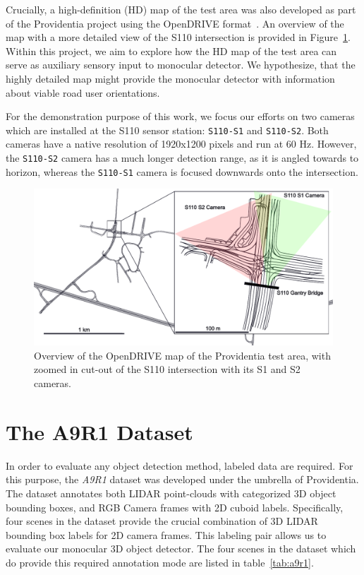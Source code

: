 Crucially, a high-definition (HD) map of the test area was also developed as part of the Providentia project using the OpenDRIVE format~\cite{dupuis2010opendrive}.
An overview of the map with a more detailed view of the S110 intersection is provided in Figure~\ref{fig:providentia-opendrive-map}.
Within this project, we aim to explore how the HD map of the test area can serve as  auxiliary sensory input to monocular detector.
We hypothesize, that the highly detailed map might provide the monocular detector with information about viable road user orientations.

For the demonstration purpose of this work, we focus our efforts on two cameras which are installed at the S110 sensor station: \texttt{S110-S1} and \texttt{S110-S2}.
Both cameras have a native resolution of 1920x1200 pixels and run at 60 Hz.
However, the \texttt{S110-S2} camera has a much longer detection range, as it is angled towards to horizon, whereas the \texttt{S110-S1} camera is focused downwards onto the intersection.

\begin{figure}[htb]
    \includegraphics[width=\linewidth]{figures/map}
    \caption{Overview of the OpenDRIVE map of the Providentia test area, with zoomed in cut-out of the S110 intersection with its S1 and S2 cameras.}
    \label{fig:providentia-opendrive-map}
\end{figure}


\section{The A9R1 Dataset}
\label{sec:a9dataset}

In order to evaluate any object detection method, labeled data are required.
For this purpose, the \textit{A9R1} dataset was developed under the umbrella of Providentia.
The dataset annotates both LIDAR point-clouds with categorized 3D object bounding boxes, and RGB Camera frames with 2D cuboid labels.
Specifically, four scenes in the dataset provide the crucial combination of 3D LIDAR bounding box labels for 2D camera frames.
This labeling pair allows us to evaluate our monocular 3D object detector.
The four scenes in the dataset which do provide this required annotation mode are listed in table~\ref{tab:a9r1}.

